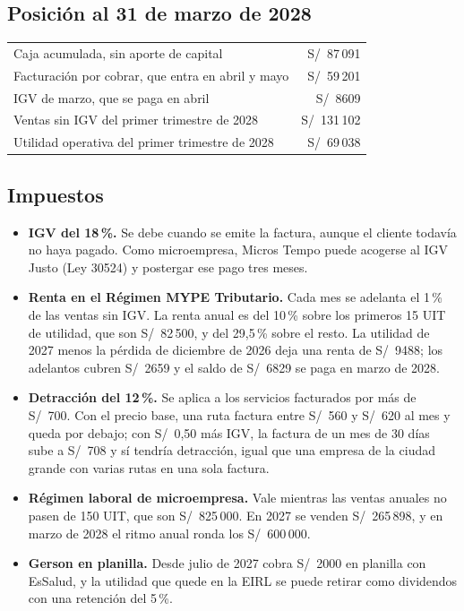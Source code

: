 \documentclass[10.5pt,a4paper]{article}
\begin{document}
\subsection{Posición al 31 de marzo de 2028}

\begin{center}
\begin{tabularx}{0.8\linewidth}{@{}Xr@{}}
\toprule
Caja acumulada, sin aporte de capital & S/~87\,091\\
Facturación por cobrar, que entra en abril y mayo & S/~59\,201\\
IGV de marzo, que se paga en abril & S/~8609\\
Ventas sin IGV del primer trimestre de 2028 & S/~131\,102\\
Utilidad operativa del primer trimestre de 2028 & S/~69\,038\\
\bottomrule
\end{tabularx}
\end{center}

\subsection{Impuestos}

\begin{itemize}
\item \textbf{IGV del 18\,\%.} Se debe cuando se emite la factura, aunque el cliente todavía no haya pagado. Como microempresa, Micros Tempo puede acogerse al IGV Justo (Ley 30524) y postergar ese pago tres meses.
\item \textbf{Renta en el Régimen MYPE Tributario.} Cada mes se adelanta el 1\,\% de las ventas sin IGV. La renta anual es del 10\,\% sobre los primeros 15 UIT de utilidad, que son S/~82\,500, y del 29,5\,\% sobre el resto. La utilidad de 2027 menos la pérdida de diciembre de 2026 deja una renta de S/~9488; los adelantos cubren S/~2659 y el saldo de S/~6829 se paga en marzo de 2028.
\item \textbf{Detracción del 12\,\%.} Se aplica a los servicios facturados por más de S/~700. Con el precio base, una ruta factura entre S/~560 y S/~620 al mes y queda por debajo; con S/~0,50 más IGV, la factura de un mes de 30 días sube a S/~708 y sí tendría detracción, igual que una empresa de la ciudad grande con varias rutas en una sola factura.
\item \textbf{Régimen laboral de microempresa.} Vale mientras las ventas anuales no pasen de 150 UIT, que son S/~825\,000. En 2027 se venden S/~265\,898, y en marzo de 2028 el ritmo anual ronda los S/~600\,000.
\item \textbf{Gerson en planilla.} Desde julio de 2027 cobra S/~2000 en planilla con EsSalud, y la utilidad que quede en la EIRL se puede retirar como dividendos con una retención del 5\,\%.
\end{itemize}
\end{document}
